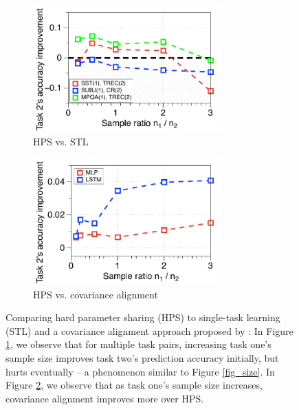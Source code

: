 \begin{figure}%
	\begin{subfigure}[t]{0.5\textwidth}
		\centering
		\vspace{0pt}
		\includegraphics[width=0.8\textwidth]{figures/fig3a.pdf}
		\caption{HPS vs. STL}
		\label{fig_ab_data}
	\end{subfigure}\hfill
	\begin{subfigure}[t]{0.5\textwidth}
		\centering
		\vspace{0pt}
		\includegraphics[width=0.8\textwidth]{figures/fig3b.pdf}
		\caption{HPS vs. covariance alignment}
		\label{fig_ab_cov}
	\end{subfigure}
	\caption{Comparing hard parameter sharing (HPS) to single-task learning (STL) and a covariance alignment approach proposed by \cite{WZR20}:
	In Figure \ref{fig_ab_data}, we observe that for multiple task pairs, increasing task one's sample size improves task two's prediction accuracy initially, but hurts eventually -- a phenomenon similar  to Figure \ref{fig_size}.
	In Figure \ref{fig_ab_cov}, we observe that as task one's sample size increases, covariance alignment improves more over HPS.}
	\label{fig_text}

\end{figure}

